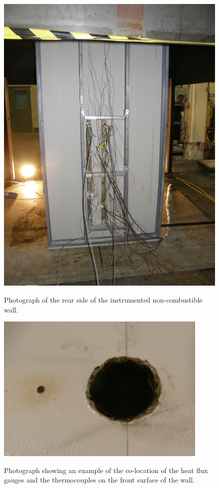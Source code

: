 \documentclass[twoside]{uocthesis}
\begin{document}
{{\begin{figure}
	\centering
	\includegraphics[width=\textwidth]{../Figures/Instrumented_Wall_Rear_photo}\\
	\caption[Photograph of the rear side of the instrumented non-combustible wall]{Photograph of the rear side of the instrumented non-combustible wall.}
	\label{Instrumented_Wall_Rear_photo}
\end{figure}

\begin{figure}
	\centering
	\includegraphics[width=4.0in]{../Figures/Instrumented_Wall_Close_up_TC_HF_photo}\\
	\caption[Photograph showing an example of the co-location of the heat flux gauges and the thermocouples on the front surface of the wall.]{Photograph showing an example of the co-location of the heat flux gauges and the thermocouples on the front surface of the wall.}
	\label{Instrumented_Wall_Close_up_TC_HF_photo}
\end{figure}

}}
\end{document}
